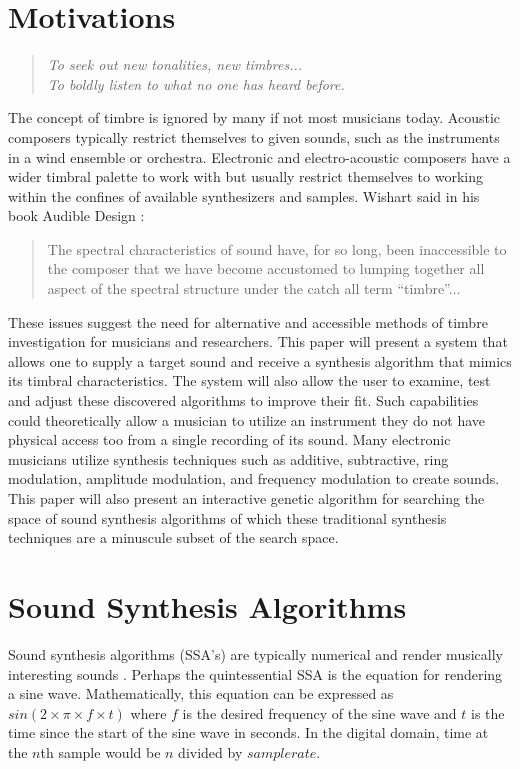 \documentclass[12pt]{article}
\begin{document}
\section{Motivations}
\begin{quote}
\emph{To seek out new tonalities, new timbres... \\
To boldly listen to what no one has heard before.} \citep{sethares2004tuning}
\end{quote}
The concept of timbre is ignored by many if not most musicians today. Acoustic composers typically restrict themselves to given sounds, such as the instruments in a wind ensemble or orchestra. Electronic and electro-acoustic composers have a wider timbral palette to work with but usually restrict themselves to working within the confines of available synthesizers and samples. Wishart said in his book Audible Design \citep{wishart1994audible}:
\begin{quote}
The spectral characteristics of sound have, for so long, been inaccessible to the composer that we have become accustomed to lumping together all aspect of the spectral structure under the catch all term ``timbre''...
\end{quote}	 
These issues suggest the need for alternative and accessible methods of timbre investigation for musicians and researchers. This paper will present a system that allows one to supply a target sound and receive a synthesis algorithm that mimics its timbral characteristics. The system will also allow the user to examine, test and adjust these discovered algorithms to improve their fit. Such capabilities could theoretically allow a musician to utilize an instrument they do not have physical access too from a single recording of its sound. Many electronic musicians utilize synthesis techniques such as additive, subtractive, ring modulation, amplitude modulation, and frequency modulation to create sounds. This paper will also present an interactive genetic algorithm for searching the space of sound synthesis algorithms of which these traditional synthesis techniques are a minuscule subset of the search space.

\section{Sound Synthesis Algorithms}\label{SSA}
Sound synthesis algorithms (SSA's) are typically numerical and render musically interesting sounds \citep{tolonen1998evaluation}. Perhaps the quintessential SSA is the equation for rendering a sine wave. Mathematically, this equation can be expressed as $sin (2 \times \pi \times f \times t)$ where $f$ is the desired frequency of the sine wave and $t$ is the time since the start of the sine wave in seconds. In the digital domain, time at the $n$th sample would be $n$ divided by $sample rate$.
	
\end{document}
